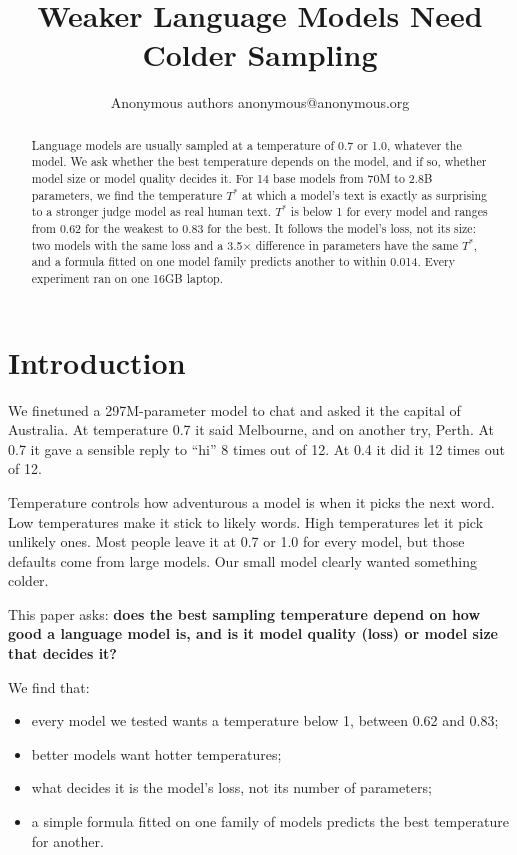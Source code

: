 \documentclass[10pt]{article}
\title{Weaker Language Models Need Colder Sampling}
\author{\name Anonymous authors \email anonymous@anonymous.org}
\begin{document}
\maketitle

\begin{abstract}
Language models are usually sampled at a temperature of 0.7 or 1.0, whatever the model. We ask whether the best temperature depends on the model, and if so, whether model size or model quality decides it. For 14 base models from 70M to 2.8B parameters, we find the temperature $T^*$ at which a model's text is exactly as surprising to a stronger judge model as real human text. $T^*$ is below 1 for every model and ranges from 0.62 for the weakest to 0.83 for the best. It follows the model's loss, not its size: two models with the same loss and a 3.5$\times$ difference in parameters have the same $T^*$, and a formula fitted on one model family predicts another to within 0.014. Every experiment ran on one 16GB laptop.
\end{abstract}

\section{Introduction}

We finetuned a 297M-parameter model to chat and asked it the capital of Australia. At temperature 0.7 it said Melbourne, and on another try, Perth. At 0.7 it gave a sensible reply to ``hi'' 8 times out of 12. At 0.4 it did it 12 times out of 12.

Temperature controls how adventurous a model is when it picks the next word. Low temperatures make it stick to likely words. High temperatures let it pick unlikely ones. Most people leave it at 0.7 or 1.0 for every model, but those defaults come from large models. Our small model clearly wanted something colder.

This paper asks: \textbf{does the best sampling temperature depend on how good a language model is, and is it model quality (loss) or model size that decides it?}

We find that:
\begin{itemize}
    \item every model we tested wants a temperature below 1, between 0.62 and 0.83;
    \item better models want hotter temperatures;
    \item what decides it is the model's loss, not its number of parameters;
    \item a simple formula fitted on one family of models predicts the best temperature for another.
\end{itemize}
\end{document}
